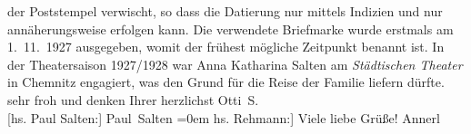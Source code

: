 \begin{ledgroupsized}[t]{13cm}
{{{                  der Poststempel verwischt, so dass die Datierung nur mittels Indizien und nur
                  annäherungsweise erfolgen kann. Die verwendete Briefmarke wurde erstmals am 1. 11. 1927
               ausgegeben, womit der frühest mögliche Zeitpunkt benannt ist. In der Theatersaison 1927/1928 war
                  Anna Katharina Salten am \emph{Städtischen Theater}
                  in Chemnitz engagiert, was den Grund für die
                  Reise der Familie liefern dürfte.}}}\label{K_L03580-1h} sehr froh und denken Ihrer herzlichst\pend
           \pstart
           \spacefill\mbox{Otti S.}{\\[\baselineskip]}{[}hs. Paul Salten:{]} \spacefill\mbox{Paul Salten}\pend
           \leftskip=0em{}\pstart
           \noindent{}{[}hs. Rehmann:{]} Viele liebe Grüße! \pend
           \pstart \spacefill\mbox{Annerl}\pend{}
         
         \endnumbering{}\end{ledgroupsized}\begin{anhang}\end{anhang}\newcommand{\dateiname}{L03580}\newcommand{\titel}{Felix Salten u. a. an Arthur Schnitzler, [November 1927 – Juni 1928?]}\newcommand{\editorInnen}{Martin Anton Müller und Laura Untner}
      